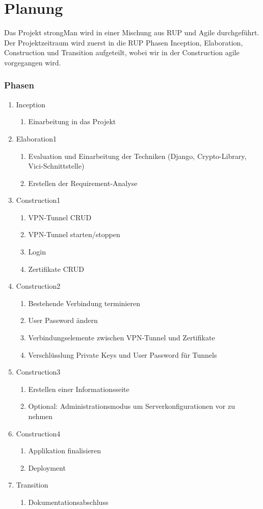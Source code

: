 \section{Planung}
Das Projekt strongMan wird in einer Mischung aus \Gls{RUP} und Agile durchgeführt. Der Projektzeitraum wird zuerst in die RUP Phasen Inception, Elaboration, Construction und Transition aufgeteilt, wobei wir in der Construction agile vorgegangen wird.

\subsubsection{Phasen}
\begin{enumerate}
  \item Inception
  \begin{enumerate}
    \item Einarbeitung in das Projekt
  \end{enumerate}
  \item Elaboration1
  \begin{enumerate}
    \item Evaluation und Einarbeitung der Techniken (Django, Crypto-Library, Vici-Schnittstelle)
    \item Erstellen der Requirement-Analyse
  \end{enumerate}
  \item Construction1
  \begin{enumerate}
    \item VPN-Tunnel CRUD
    \item VPN-Tunnel starten/stoppen
    \item Login 
    \item Zertifikate CRUD
  \end{enumerate}
  \item Construction2
  \begin{enumerate}
    \item Bestehende Verbindung terminieren
    \item User Password ändern 
    \item Verbindungselemente zwischen VPN-Tunnel und Zertifikate
    \item Verschlüsslung Private Keys und User Password für Tunnels
  \end{enumerate}
    \item Construction3
  \begin{enumerate}
  	\item Erstellen einer Informationsseite
    \item Optional: Administrationsmodus um Serverkonfigurationen vor zu nehmen
  \end{enumerate}
      \item Construction4
  \begin{enumerate}
    \item Applikation finalisieren
    \item Deployment
  \end{enumerate}
  \item Transition
  \begin{enumerate}
    \item Dokumentationsabschluss
  \end{enumerate}
\end{enumerate}
\newpage






